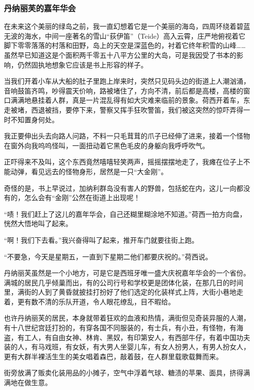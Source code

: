 \subsubsection*{丹纳丽芙的嘉年华会}
\par 在未来这个美丽的绿岛之前，我一直幻想着它是一个美丽的海岛，四周环绕着碧蓝无波的海水，中间一座著名的雪山“荻伊笛”（Teide）高入云霄，庄严地俯视着它脚下零零落落的村落和田野，岛上的天空是深蓝色的，衬着它终年积雪的山峰……虽然早已知道这是个面积两千零五十八平方公里的大岛，可是我因受了书本的影响，仍然固执地想象它应该是书上形容的样子。
\par 当我们开着小车从大船的肚子里跑上岸来时，突然只见码头边的街道上人潮汹涌，音响鼓笛齐鸣，吵得震天价响，路被堵住了，方向不清，前后都是高楼，高楼的窗口满满地悬挂着人群，真是一片混乱得有如大灾难来临前的景象。荷西开着车，东走被堵，西退被挡，要停下来，警察又挥手狂吹警笛，我们被这突然的惊吓弄得一时不知置身何处。
\par 我正要伸出头去向路人问路，不料一只毛茸茸的爪子已经伸了进来，接着一个怪物在窗外向我呜呜怪叫，一面扭动着它黑色毛皮的身躯向我呼呼吹气。
\par 正吓得来不及叫，这个东西竟然嘻嘻轻笑两声，摇摇摆摆地走了，我瘫在位子上不能动弹，看见远去的怪物身形，居然是一只“大金刚”。
\par 奇怪的是，书上早说过，加纳利群岛没有害人的野兽，包括蛇在内，这儿一向都没有的，怎么会有“金刚”公然在街道上出现呢！
\par “啧！我们赶上了这儿的嘉年华会，自己还糊里糊涂地不知道。”荷西一拍方向盘，恍然大悟地叫了起来。
\par “啊！我们下去看。”我兴奋得叫了起来，推开车门就要往街上跑。
\par “不要急，今天是星期五，一直到下星期二他们都要庆祝的。”荷西说。
\par 丹纳丽芙虽然是一个小地方，可是它是西班牙唯一盛大庆祝嘉年华会的一个省份。满城的居民几乎倾巢而出，有的公司行号和学校更是团体化装，在那几日的时间里，满街的人到了黄昏就披挂打扮好了他们选定的化装样式上阵，大街小巷地走着，更有数不清的乐队开道，令人眼花缭乱，目不暇给。
\par 也许丹纳丽芙的居民，本身就带着狂欢的血液和热情，满街但见奇装异服的人潮，有十八世纪宫廷打扮的，有穿各国不同服装的，有士兵，有小丑，有怪物，有海盗，有工人，有自由女神、林肯、黑奴，有印第安人，有西部牛仔，有着中国功夫装的人，有马戏班，有女妖，有大男人坐婴儿车，有女人扮男人，有男人扮女人，更有大群半裸活生生的美女唱着森巴，敲着鼓，在人群里载歌载舞而来。
\par 街旁放满了贩卖化装用品的小摊子，空气中浮着气球、糖渍的苹果、面具，挤得满满地在做生意。
